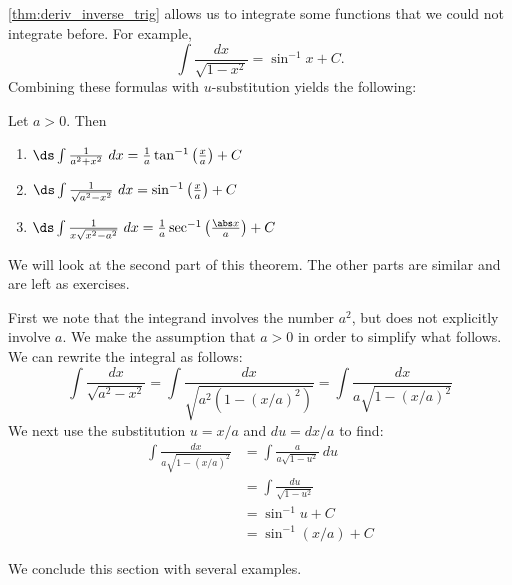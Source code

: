 \autoref{thm:deriv_inverse_trig} allows us to integrate some functions that we could not integrate before. For example,
\[\int\frac{dx}{\sqrt{1-x^2}}=\sin^{-1}x+C.\]
Combining these formulas with $u$-substitution yields the following:

{
\begin{theorem}\label{thm:int_inverse_trig}
Let $a>0$.  Then
\begin{enumerate}
	\item	$\ds\int\frac1{a^2+x^2}\ dx=\frac1a\tan^{-1}\left(\frac xa\right) + C$
	\item	$\ds\int\frac1{\sqrt{a^2-x^2}}\ dx=\sin^{-1}\left(\frac xa\right)+C$
	\item	$\ds\int\frac1{x\sqrt{x^2-a^2}}\ dx=\frac1a\sec^{-1}\left(\frac{\abs x}a\right)+C$
\end{enumerate}
\end{theorem}}

We will look at the second part of this theorem. The other parts are similar and are left as exercises.

First we note that the integrand involves the number $a^2$, but does not explicitly involve $a$. We make the assumption that $a>0$ in order to simplify what follows. We can rewrite the integral as follows:
\[\int\frac{dx}{\sqrt{a^2-x^2}}=\int\frac{dx}{\sqrt{a^2(1-(x/a)^2)}}=\int\frac{dx}{a\sqrt{1-(x/a)^2}}\]
We next use the substitution $u=x/a$ and $du=dx/a$ to find: 
\begin{align*}
\int\frac{dx}{a\sqrt{1-(x/a)^2}}
&=\int\frac{a}{a\sqrt{1-u^2}}\ du\\
&=\int \frac{du}{\sqrt{1-u^2}}\\
&=\sin^{-1}u+C\\
&=\sin^{-1}(x/a)+C
\end{align*}

We conclude this section with several examples.

